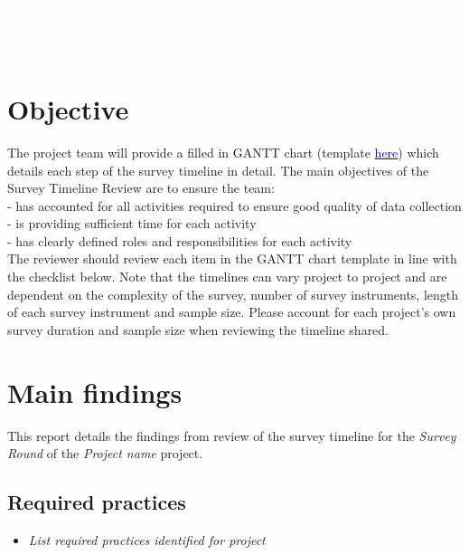 \documentclass{report}
\newcommand{\titleBox}[1]{
	\begin{tcolorbox}
		[colframe = fontcolor,
		colback = fontcolor,
		sharp corners,
		halign = flush center,
		valign = center,
		height = 0.2\textwidth,
		after skip = 1cm]
		#1
	\end{tcolorbox}
}
\begin{document}
	
	
	\titleBox{
		\textcolor{white}{\Large{Project: Name}} \\
		\textcolor{white}{\Large{Survey: Round}} \\
		\textcolor{white}{\Large{DIME Analytics Survey Timeline Review Checklist}}
	}
	
	\section*{Objective}
	The project team will provide a filled in GANTT chart (template \href{https://www.dropbox.com/s/h76tf1xstcisfv4/GANTT\%20Survey\%20Timeline.xlsx?dl=0}{\textcolor{blue}{here}}) which details each step of the survey timeline in detail.  The main objectives of the Survey Timeline Review are to ensure the team: \\
	
	\indent- has accounted for all activities required to ensure good quality of data collection \\
	\indent- is providing sufficient time for each activity \\
	\indent- has clearly defined roles and responsibilities for each activity \\
	
	The reviewer should review each item in the GANTT chart template in line with the checklist below. Note that the timelines can vary project to project and are dependent on the complexity of the survey, number of survey instruments, length of each survey instrument and sample size. Please account for each project’s own survey duration and sample size when reviewing the timeline shared. \\
	
	
	\section*{Main findings}
	
	This report details the findings from review of the survey timeline for the \textit{Survey Round}  of the \textit{Project name} project.
	
	\subsection*{Required practices}
	\begin{itemize}
		\item \textit{List required practices identified for project}
	\end{itemize} 
\end{document}
